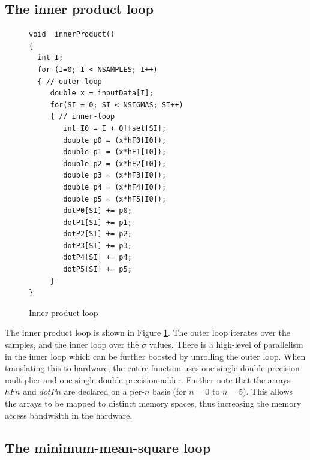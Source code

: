 \documentclass[conference]{IEEEtran}
\begin{document}


\subsection{The inner product loop} \label{sec:InnerProduct}

\begin{figure}
\begin{centering}
\small\begin{verbatim}
void  innerProduct()
{
  int I;
  for (I=0; I < NSAMPLES; I++)
  { // outer-loop
     double x = inputData[I];
     for(SI = 0; SI < NSIGMAS; SI++)
     { // inner-loop
        int I0 = I + Offset[SI];
        double p0 = (x*hF0[I0]);
        double p1 = (x*hF1[I0]);
        double p2 = (x*hF2[I0]);
        double p3 = (x*hF3[I0]);
        double p4 = (x*hF4[I0]);
        double p5 = (x*hF5[I0]);
        dotP0[SI] += p0;
        dotP1[SI] += p1;
        dotP2[SI] += p2;
        dotP3[SI] += p3;
        dotP4[SI] += p4;
        dotP5[SI] += p5;
     }
}
\end{verbatim}
\normalsize
\end{centering}
\caption{Inner-product loop}
\label{fig:InnerProduct}
\end{figure}

The inner product loop is shown in Figure \ref{fig:InnerProduct}.
The outer loop iterates over the samples, and the inner
loop over the $\sigma$ values.  There is a high-level
of parallelism in the inner loop which can be further
boosted by unrolling the outer loop.   When translating
this to hardware, the entire function uses one single double-precision
multiplier and one single double-precision adder.  Further
note that the arrays $hFn$ and $dotPn$ are declared on
a per-$n$ basis (for $n=0$ to $n=5$). This allows the arrays to be mapped to
distinct memory spaces, thus increasing the memory access bandwidth in the hardware.

\subsection{The minimum-mean-square loop} \label{sec:MMSE}
\end{document}
